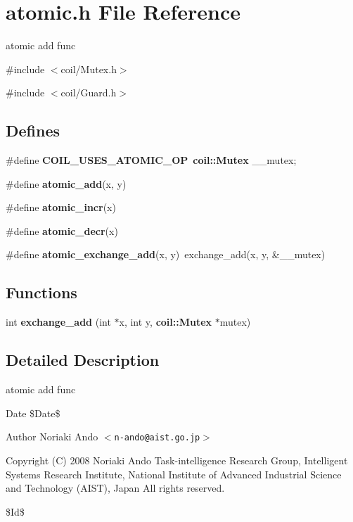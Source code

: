 \section{atomic.h File Reference}
\label{atomic_8h}


atomic add func  


{\ttfamily \#include $<$coil/Mutex.h$>$}\par
{\ttfamily \#include $<$coil/Guard.h$>$}\par
\subsection*{Defines}
\begin{DoxyCompactItemize}
\item 
\#define {\bf COIL\_\-USES\_\-ATOMIC\_\-OP}~{\bf coil::Mutex} \_\-\_\-mutex;
\item 
\#define {\bf atomic\_\-add}(x, y)
\item 
\#define {\bf atomic\_\-incr}(x)
\item 
\#define {\bf atomic\_\-decr}(x)
\item 
\#define {\bf atomic\_\-exchange\_\-add}(x, y)~exchange\_\-add(x, y, \&\_\-\_\-mutex)
\end{DoxyCompactItemize}
\subsection*{Functions}
\begin{DoxyCompactItemize}
\item 
int {\bf exchange\_\-add} (int $\ast$x, int y, {\bf coil::Mutex} $\ast$mutex)
\end{DoxyCompactItemize}


\subsection{Detailed Description}
atomic add func \begin{DoxyDate}{Date}
\$Date\$ 
\end{DoxyDate}
\begin{DoxyAuthor}{Author}
Noriaki Ando $<${\tt n-\/ando@aist.go.jp}$>$
\end{DoxyAuthor}
Copyright (C) 2008 Noriaki Ando Task-\/intelligence Research Group, Intelligent Systems Research Institute, National Institute of Advanced Industrial Science and Technology (AIST), Japan All rights reserved.

\$Id\$ 


